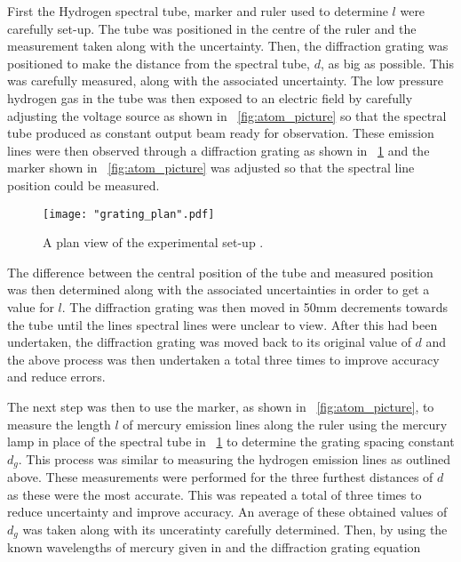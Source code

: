 \documentclass{article}
\newcommand{\figref}[2][\figurename~]{#1\ref{#2}}
\begin{document}
\noindent
First the Hydrogen spectral tube, marker and ruler used to determine $l$ were carefully set-up. The tube was positioned in the centre of the ruler and the measurement taken along with the uncertainty. Then, the diffraction grating was positioned to make the distance from the spectral tube, $d$, as big as possible. This was carefully measured, along with the associated uncertainty. The low pressure hydrogen gas in the tube was then exposed to an electric field by carefully adjusting the voltage source as shown in \figref{fig:atom_picture} so that the spectral tube produced as constant output beam ready for observation. These emission lines were then observed through a diffraction grating as shown in \figref{fig:grating_plan} and the marker shown in \figref{fig:atom_picture} was adjusted so that the spectral line position could be measured. 

\begin{figure}[h]
\centering
\texttt{[image: "grating\_plan".pdf]}
\caption{A plan view of the experimental set-up \cite{Paper01}.}
\label{fig:grating_plan}
\end{figure}

\vspace{2mm}
\noindent
The difference between the central position of the tube and measured position was then determined along with the associated uncertainties in order to get a value for $l$. The diffraction grating was then moved in 50mm decrements towards the tube until the lines spectral lines were unclear to view. After this had been undertaken, the diffraction grating was moved back to its original value of $d$ and the above process was then undertaken a total three times to improve accuracy and reduce errors.

\vspace{2mm}
\noindent
The next step was then to use the marker, as shown in \figref{fig:atom_picture}, to measure the length $l$ of mercury emission lines along the ruler using the mercury lamp in place of the spectral tube in \figref{fig:grating_plan} to determine the grating spacing constant $d_g$. This process was similar to measuring the hydrogen emission lines as outlined above. These measurements were performed for the three furthest distances of $d$ as these were the most accurate. This was repeated a total of three times to reduce uncertainty and improve accuracy. An average of these obtained values of $d_g$ was taken along with its unceratinty carefully determined. Then, by using the known wavelengths of mercury given in \cite{Paper01} and the diffraction grating equation 
\end{document}
